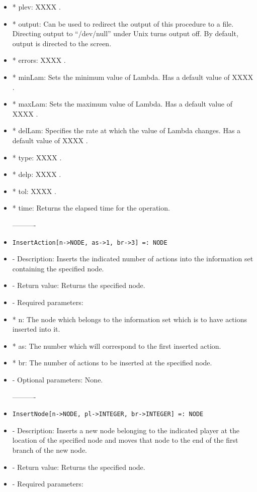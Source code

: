 \begin{itemize}
\bd
\item	
 *  plev:  XXXX .
\item
*  output:  Can be used to redirect the output of this procedure to a
file.  Directing output to ``/dev/null'' under Unix turns output off.
By default, output is directed to the screen.
\item
*  errors:  XXXX .
\item
*  minLam:  Sets the minimum value of Lambda.  Has a default value of
XXXX .
\item
*  maxLam:  Sets the maximum value of Lambda.  Has a default value of XXXX .
\item
*  delLam:  Specifies the rate at which the value of Lambda changes.
Has a default value of XXXX .
\item
*  type:  XXXX .
\item
*  delp:  XXXX .
\item
*  tol:  XXXX .
\item
*  time:  Returns the elapsed time for the operation.
\ed
\ed

----------

\item
\begin{verbatim}
InsertAction[n->NODE, as->1, br->3] =: NODE
\end{verbatim}

\bd
\item
- Description:  Inserts the indicated number of actions into the 
information set containing the specified node.
\item
- Return value:  Returns the specified node.
\item
- Required parameters:

\bd
\item
*  n:  The node which belongs to the information set which is to have
actions inserted into it.
\item
*  as:  The number which will correspond to the first inserted action.
\item
*  br:  The number of actions to be inserted at the specified node.
\ed

\item
- Optional parameters:  None.
\ed


----------
\item
\begin{verbatim}
InsertNode[n->NODE, pl->INTEGER, br->INTEGER] =: NODE
\end{verbatim}

\bd
\item
- Description:  Inserts a new node belonging to the indicated player at 
the location of the specified node and moves that node to the end of 
the first branch of the new node.
\item
- Return value:  Returns the specified node.
\item
- Required parameters:


\end{itemize}
